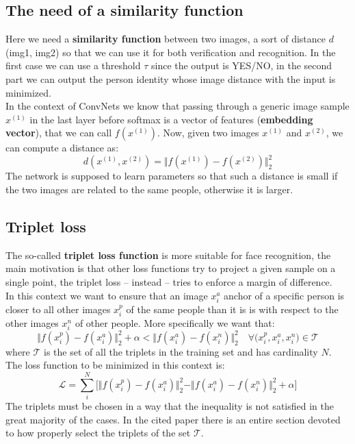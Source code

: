 \subsection{The need of a similarity function}
Here we need a \textbf{similarity function} between two images, a sort of distance $d$(img1, img2) so that we can use it for both verification and recognition. In the first case we can use a threshold $\tau$ since the output is YES/NO, in the second part we can output the person identity whose image distance with the input is minimized.\\
In the context of ConvNets we know that passing through a generic image sample $x^{(1)}$ in the last layer before softmax is a vector of features (\textbf{embedding vector}), that we can call $f(x^{(1)})$. Now, given two images $x^{(1)}$ and $x^{(2)}$, we can compute a distance as:
\begin{equation}
    d(x^{(1)}, x^{(2)})=\Vert f(x^{(1)}) - f(x^{(2)}) \Vert_2^2 
\end{equation}
The network is supposed to learn parameters so that such a distance is small if the two images are related to the same people, otherwise it is larger.

\subsection{Triplet loss}
The so-called \textbf{triplet loss function} is more suitable for face recognition, the main motivation is that other loss functions try to project a given sample on a single point, the triplet loss -- instead -- tries to enforce a margin of difference.\\
In this context we want to ensure that an image $x_i^{a}$ anchor of a specific person is closer to all other images $x_i^{p}$ of the same people than it is is with respect to the other images $x_i^{n}$ of other people. More specifically we want that:
\begin{equation}
    \Vert f(x_i^{p})-f(x_i^{a}) \Vert_2^2 + \alpha <
    \Vert f(x_i^{a})-f(x_i^{n}) \Vert_2^2 \quad 
    \forall \big(
        x_i^{p}, x_i^{a}, x_i^{n}
    \big) \in \mathcal{T}
\end{equation}
where $\mathcal{T}$ is the set of all the triplets in the training set and has cardinality $N$. The loss function to be minimized in this context is:
\begin{equation}
    \mathcal{L}=\sum_i^{N} {
        \big[
            \Vert f(x_i^{p})-f(x_i^{a}) \Vert_2^2 - \Vert f(x_i^{a})-f(x_i^{n}) \Vert_2^2 + \alpha
        \big]
    }
\end{equation}
The triplets must be chosen in a way that the inequality is not satisfied in the great majority of the cases. In the cited paper \cite{schroff2015facenet} there is an entire section devoted to how properly select the triplets of the set $\mathcal{T}$.


